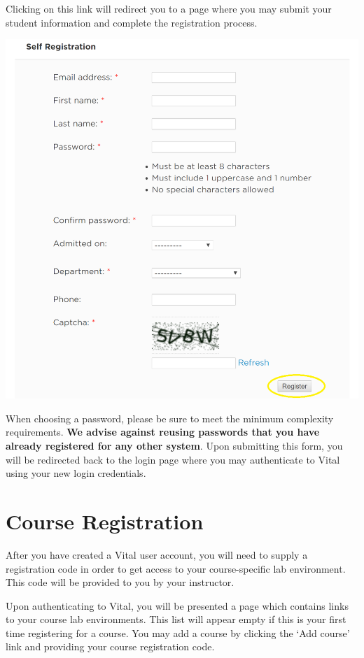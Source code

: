 \documentclass[12pt]{article}
\begin{document}
Clicking on this link will redirect you to a page where you may submit your student information and complete the registration process. 

{%
\centering
\includegraphics[scale=0.50]{self_registration.png}

}

When choosing a password, please be sure to meet the minimum complexity requirements. \textbf{We advise against reusing passwords that you have already registered for any other system}. Upon submitting this form, you will be redirected back to the login page where you may authenticate to Vital using your new login credentials.

\section*{Course Registration}
After you have created a Vital user account, you will need to supply a registration code in order to get access to your course-specific lab environment. This code will be provided to you by your instructor.

Upon authenticating to Vital, you will be presented a page which contains links to your course lab environments. This list will appear empty if this is your first time registering for a course. You may add a course by clicking the `Add course' link and providing your course registration code.
\end{document}
